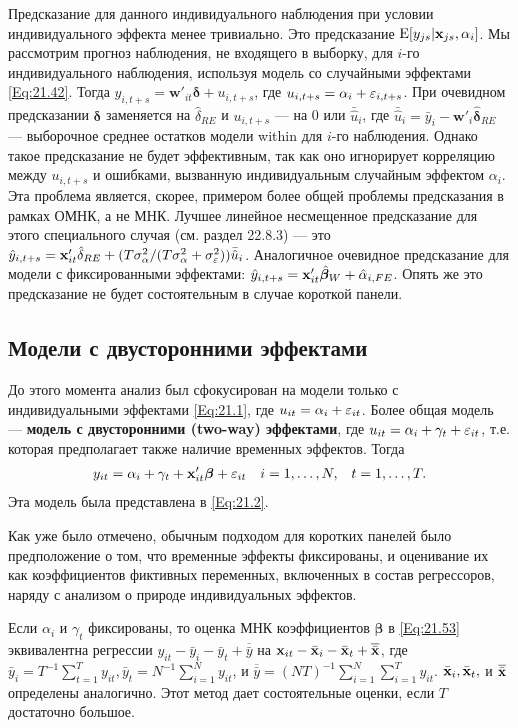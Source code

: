 Предсказание для данного индивидуального наблюдения при условии индивидуального эффекта менее тривиально. Это предсказание $\mathrm E[y_{js}|\mathbf{x}_{js}, \alpha_i]$. Мы рассмотрим прогноз наблюдения, не входящего в выборку, для $i$-го индивидуального наблюдения, используя модель со случайными эффектами \ref{Eq:21.42}. Тогда $y_{i,t+s}=\mathbf w'_{it} \bm\delta + u_{i,t+s}$, где $u_{i,t+s}=\alpha_i+\varepsilon_{i,t+s}$. При очевидном предсказании $\bm\delta$ заменяется на $\hat{\delta}_{RE}$ и $u_{i,t+s}$ --- на 0 или $\bar{\hat{u}}_i$, где $\bar{\hat{u}}_i=\bar{y}_i-\mathbf w'_i\hat{\bm\delta}_{RE}$ --- выборочное среднее остатков модели within для $i$-го наблюдения. Однако такое предсказание не будет эффективным, так как оно игнорирует корреляцию между $u_{i,t+s}$ и ошибками, вызванную индивидуальным случайным эффектом $\alpha_i$. Эта проблема является, скорее, примером более общей проблемы предсказания в рамках ОМНК, а не МНК. Лучшее линейное несмещенное предсказание для этого специального случая (см. раздел 22.8.3) --- это $\hat{y}_{i,t+s}=\mathbf{x}'_{it}\hat{\delta}_{RE}+(T\sigma^2_\alpha/(T\sigma^2_\alpha+\sigma^2_\varepsilon))\bar{\hat{u}}_i$.
Аналогичное очевидное предсказание для модели с фиксированными эффектами: $\hat{y}_{i,t+s}=\mathbf{x}'_{it}\hat{\bm\beta}_W+\hat{\alpha}_{i,FE}$. Опять же это предсказание не будет состоятельным в случае короткой панели.

\subsection{Модели с двусторонними  эффектами}

До этого момента анализ был сфокусирован на модели только с индивидуальными эффектами \ref{Eq:21.1}, где $u_{it}=\alpha_i+\varepsilon_{it}$. Более общая модель --- \textbf{модель с двусторонними (two-way) эффектами}, где $u_{it}=\alpha_i+\gamma_t+\varepsilon_{it}$, т.е. которая предполагает также наличие временных эффектов. Тогда
 \begin{align}
& y_{it}=\alpha_i+\gamma_t+\mathbf{x}'_{it}\bm\beta+\varepsilon_{it}
& i=1, \dots, N, &
& t=1, \dots, T.
\label{Eq:21.53}
\end{align}
Эта модель была представлена в \ref{Eq:21.2}.

Как уже было отмечено, обычным подходом для коротких панелей было предположение о том, что временные эффекты фиксированы, и оценивание их как коэффициентов фиктивных переменных, включенных в состав регрессоров, наряду с анализом о природе индивидуальных эффектов.

Если $\alpha_i$ и $\gamma_t$ фиксированы, то оценка МНК коэффициентов $\bm\beta$ в \ref{Eq:21.53} эквивалентна регрессии $y_{it}-\bar{y}_i-\bar{y}_t+\overline{\bar{y}}$ на $\mathbf{x}_{it}-\bar{\mathbf{x}}_i-\bar{\mathbf{x}}_t+\overline{\bar{\mathbf{x}}}$, где $\bar{y}_i=T^{-1}\sum^T_{t=1} y_{it}, \bar{y}_t=N^{-1}\sum^N_{i=1}y_{it}$, и $\overline{\bar{y}}=(NT)^{-1}\sum^N_{i=1} \sum^T_{i=1}y_{it}$. $\bar{\mathbf{x}}_i, \bar{\mathbf{x}}_t,$ и $\overline{\bar{\mathbf{x}}}$ определены аналогично. Этот метод дает состоятельные оценки, если $T$ достаточно большое.

